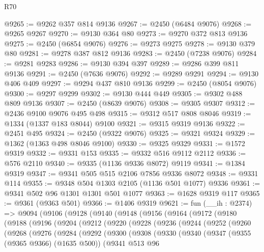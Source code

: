 \begin{lexlean}{R70}
\begin{coremodule}
@9265 := @9262 @357 @814 @9136
@9267 := @2450 (@6484 @9076)
@9268 := @9265 @9267
@9270 := @9130 @364 @80
@9273 := @9270 @372 @813 @9136
@9275 := @2450 (@6854 @9076)
@9276 := @9273 @9275
@9278 := @9130 @379 @80
@9281 := @9278 @387 @812 @9136
@9283 := @2450 (@7238 @9076)
@9284 := @9281 @9283
@9286 := @9130 @394 @397
@9289 := @9286 @399 @811 @9136
@9291 := @2450 (@7636 @9076)
@9292 := @9289 @9291
@9294 := @9130 @406 @409
@9297 := @9294 @437 @810 @9136
@9299 := @2450 (@8054 @9076)
@9300 := @9297 @9299
@9302 := @9130 @444 @449
@9305 := @9302 @488 @809 @9136
@9307 := @2450 (@8639 @9076)
@9308 := @9305 @9307
@9312 := @2436 @9100 @9076 @495 @498
@9315 := @9312 @517 @808 @8046
@9319 := @1334 (@1337 @183 @8044) @9100
@9321 := @9315 @9319 @9136
@9322 := @2451 @495
@9324 := @2450 (@9322 @9076)
@9325 := @9321 @9324
@9329 := @1362 (@1363 @498 @8046 @9100)
@9330 := @9325 @9329
@9331 := @1572 @9319
@9332 := @9331 @153
@9335 := @9332 @516 @9112 @2112
@9336 := @576 @2110
@9340 := @9335 (@1136 @9336 @8072) @9119
@9341 := @1384 @9319
@9347 := @9341 @505 @515 @2106 @7856 @9336 @8072
@9348 := @9331 @114
@9355 := @9348 @504 @1303 @2105 (@1136 @501 @1077) @9336
@9361 := @9341 @502 @96 @1301 @1301 @501 @1077
@9363 := @1628 @9319 @117
@9365 := @9361 (@9363 @501)
@9366 := @1406 @9319
@9621 := fun (__ih : @2374) =>
  @9094
    (@9106
      (@9128
        (@9140
          (@9148
            (@9156
              (@9164
                (@9172
                  (@9180
                    (@9188
                      (@9196
                        (@9204
                          (@9212
                            (@9220
                              (@9228
                                (@9236
                                  (@9244
                                    (@9252
                                      (@9260
                                        (@9268
                                          (@9276
                                            (@9284
                                              (@9292
                                                (@9300
                                                  (@9308
                                                    (@9330
                                                      (@9340
                                                        (@9347
                                                          (@9355 (@9365 @9366) (@1635 @500))
                                                          (@9341
                                                            @513
                                                            @96

\end{coremodule}
\end{lexlean}
